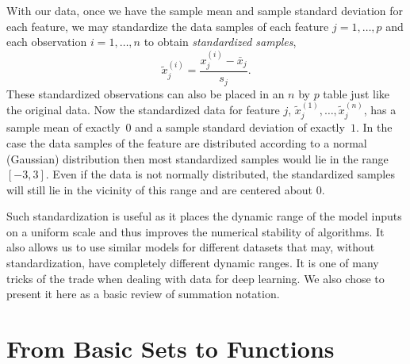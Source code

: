 \documentclass[12pt]{article}
\begin{document}
With our data, once we have the sample mean and sample standard deviation for each feature, we may standardize the data samples of each feature $j=1,\ldots,p$ and each observation $i=1,\ldots,n$ to obtain \textit{standardized samples},
%
\begin{equation}
\label{eq:ref-stand-z}
\tilde{x}^{(i)}_j = \frac{x^{(i)}_j - \overline{x}_j}{s_j}.
\end{equation}
%
These standardized observations can also be placed in an $n$ by $p$ table just like the original data. Now the standardized data for feature $j$, $\tilde{x}_j^{(1)}, \ldots, \tilde{x}_j^{(n)}$, has a sample mean of exactly~$0$ and a sample standard deviation of exactly~$1$. In the case the data samples of the feature are distributed according to a normal (Gaussian) distribution then most standardized samples would lie in the range $[-3,3]$. Even if the data is not normally distributed, the standardized samples will still lie in the vicinity of this range and are centered about $0$.

Such standardization is useful as it places the dynamic range of the model inputs on a uniform scale and thus improves the numerical stability of algorithms. It also allows us to use similar models for different datasets that may, without standardization, have completely different dynamic ranges. It is one of many tricks of the trade when dealing with data for deep learning. We also chose to present it here as a basic review of summation notation.

\section{From Basic Sets to Functions}
\label{sec:sets-and-functions}
\end{document}
